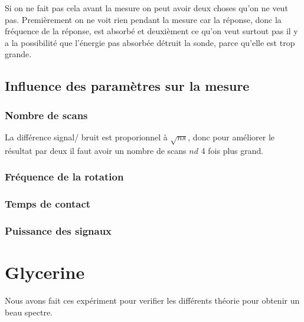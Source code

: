 \documentclass[a4paper,12pt]{scrartcl}
\begin{document}
   Si on ne fait pas cela avant la mesure on peut avoir deux choses qu'on ne veut pas. Premièrement on ne voit rien pendant la mesure car la réponse, donc la fréquence de la réponse, est absorbé et deuxièment ce qu'on veut surtout pas il y a la possibilité que l'énergie pas absorbée détruit la sonde, parce qu'elle est trop grande.

   \subsection{Influence des paramètres sur la mesure}
    \subsubsection{Nombre de scans}
     La différence signal/ bruit est proporionnel à $\sqrt{ns}$, donc pour améliorer le résultat par deux il faut avoir un nombre de scans $nd$ 4 fois plus grand.

    \subsubsection{Fréquence de la rotation}

    \subsubsection{Temps de contact}

    \subsubsection{Puissance des signaux}

 \section{Glycerine}
  Nous avons fait ces expériment pour verifier les différents théorie pour obtenir un beau spectre.
\end{document}
